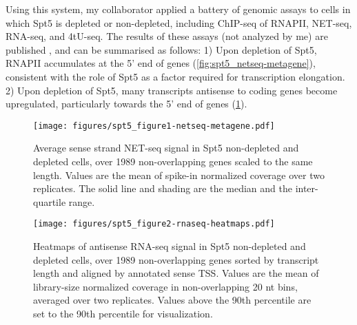 \documentclass[9pt, letterpaper]{article}
\begin{document}

Using this system, my collaborator applied a battery of genomic assays to cells in which Spt5 is depleted or non-depleted, including ChIP-seq of RNAPII, NET-seq, RNA-seq, and 4tU-seq. The results of these assays (not analyzed by me) are published \cite{shetty2017}, and can be summarised as follows: 1) Upon depletion of Spt5, RNAPII accumulates at the 5' end of genes (\ref{fig:spt5_netseq-metagene}), consistent with the role of Spt5 as a factor required for transcription elongation. 2) Upon depletion of Spt5, many transcripts antisense to coding genes become upregulated, particularly towards the 5' end of genes (\ref{fig:spt5_rnaseq-heatmaps}).

\begin{figure}[H]
    \centering
    \begin{minipage}[c]{8.5cm}
        \centering
        \texttt{[image: figures/spt5\_figure1-netseq-metagene.pdf]}
        \caption{Average sense strand NET-seq signal in Spt5 non-depleted and depleted cells, over 1989 non-overlapping genes scaled to the same length. Values are the mean of spike-in normalized coverage over two replicates. The solid line and shading are the median and the inter-quartile range.}
        \label{fig:spt5_netseq-metagene}
    \end{minipage}\hfill
    \begin{minipage}[c]{8.5cm}
        \centering
        \texttt{[image: figures/spt5\_figure2-rnaseq-heatmaps.pdf]}
        \caption{Heatmaps of antisense RNA-seq signal in Spt5 non-depleted and depleted cells, over 1989 non-overlapping genes sorted by transcript length and aligned by annotated sense TSS. Values are the mean of library-size normalized coverage in non-overlapping 20 nt bins, averaged over two replicates. Values above the 90th percentile are set to the 90th percentile for visualization.}
        \label{fig:spt5_rnaseq-heatmaps}
    \end{minipage}
\end{figure}

\end{document}

